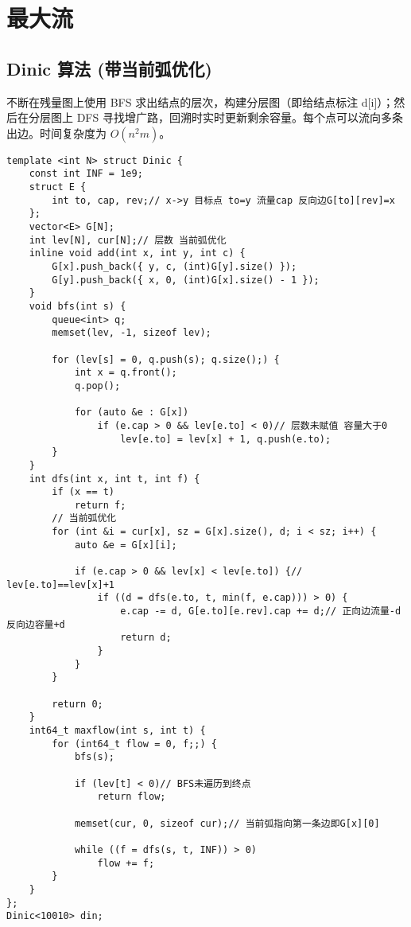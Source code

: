 \section{最大流}

\subsection{Dinic 算法 (带当前弧优化)}

\par 不断在残量图上使用 BFS 求出结点的层次，构建分层图（即给结点标注 d[i]）；然后在分层图上 DFS 寻找增广路，回溯时实时更新剩余容量。每个点可以流向多条出边。时间复杂度为 $O(n^2m)$。
\begin{verbatim}
template <int N> struct Dinic {
    const int INF = 1e9;
    struct E {
        int to, cap, rev;// x->y 目标点 to=y 流量cap 反向边G[to][rev]=x
    };
    vector<E> G[N];
    int lev[N], cur[N];// 层数 当前弧优化
    inline void add(int x, int y, int c) {
        G[x].push_back({ y, c, (int)G[y].size() });
        G[y].push_back({ x, 0, (int)G[x].size() - 1 });
    }
    void bfs(int s) {
        queue<int> q;
        memset(lev, -1, sizeof lev);

        for (lev[s] = 0, q.push(s); q.size();) {
            int x = q.front();
            q.pop();

            for (auto &e : G[x])
                if (e.cap > 0 && lev[e.to] < 0)// 层数未赋值 容量大于0
                    lev[e.to] = lev[x] + 1, q.push(e.to);
        }
    }
    int dfs(int x, int t, int f) {
        if (x == t)
            return f;
        // 当前弧优化
        for (int &i = cur[x], sz = G[x].size(), d; i < sz; i++) {
            auto &e = G[x][i];

            if (e.cap > 0 && lev[x] < lev[e.to]) {// lev[e.to]==lev[x]+1
                if ((d = dfs(e.to, t, min(f, e.cap))) > 0) {
                    e.cap -= d, G[e.to][e.rev].cap += d;// 正向边流量-d 反向边容量+d
                    return d;
                }
            }
        }

        return 0;
    }
    int64_t maxflow(int s, int t) {
        for (int64_t flow = 0, f;;) {
            bfs(s);

            if (lev[t] < 0)// BFS未遍历到终点
                return flow;

            memset(cur, 0, sizeof cur);// 当前弧指向第一条边即G[x][0]

            while ((f = dfs(s, t, INF)) > 0)
                flow += f;
        }
    }
};
Dinic<10010> din;
\end{verbatim}

